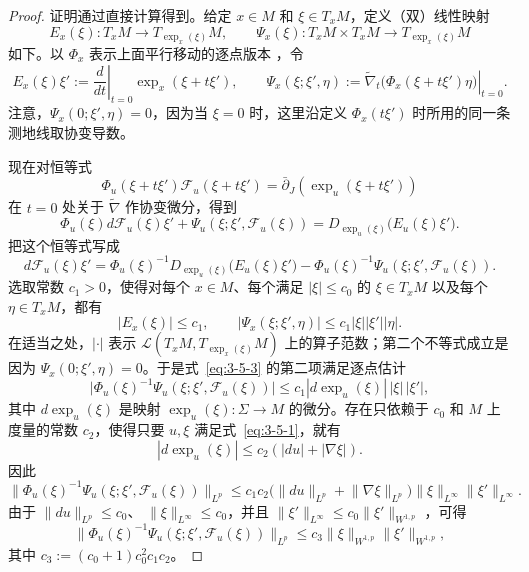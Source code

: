 \begin{proof}
证明通过直接计算得到。给定 $x\in M$ 和 $\xi\in T_xM$，定义（双）线性映射
\[
  E_x(\xi):T_xM\longrightarrow T_{\exp_x(\xi)}M,
  \qquad
  \Psi_x(\xi):T_xM\times T_xM\longrightarrow T_{\exp_x(\xi)}M
\]
如下。以 $\Phi_x$ 表示上面平行移动的逐点版本
，令
\[
  E_x(\xi)\xi'
  :=\left.\frac d{dt}\right|_{t=0}\exp_x(\xi+t\xi'),
  \qquad
  \Psi_x(\xi;\xi',\eta)
  :=\left.\widetilde\nabla_t
  \bigl(\Phi_x(\xi+t\xi')\eta\bigr)\right|_{t=0}.
\]
注意，$\Psi_x(0;\xi',\eta)=0$，因为当 $\xi=0$ 时，这里沿定义
$\Phi_x(t\xi')$ 时所用的同一条测地线取协变导数。

现在对恒等式
\[
  \Phi_u(\xi+t\xi')\mathcal F_u(\xi+t\xi')
  =\bar\partial_J(\exp_u(\xi+t\xi'))
\]
在 $t=0$ 处关于 $\widetilde\nabla$ 作协变微分，得到
\[
  \Phi_u(\xi)d\mathcal F_u(\xi)\xi'
  +\Psi_u(\xi;\xi',\mathcal F_u(\xi))
  =D_{\exp_u(\xi)}\bigl(E_u(\xi)\xi'\bigr).
\]
把这个恒等式写成
\begin{equation}\label{eq:3-5-3}
  d\mathcal F_u(\xi)\xi'
  =\Phi_u(\xi)^{-1}D_{\exp_u(\xi)}\bigl(E_u(\xi)\xi'\bigr)
  -\Phi_u(\xi)^{-1}\Psi_u(\xi;\xi',\mathcal F_u(\xi)).
\end{equation}
选取常数 $c_1>0$，使得对每个 $x\in M$、每个满足 $|\xi|\le c_0$ 的
$\xi\in T_xM$ 以及每个 $\eta\in T_xM$，都有
\[
  |E_x(\xi)|\le c_1,\qquad
  |\Psi_x(\xi;\xi',\eta)|\le c_1|\xi||\xi'||\eta|.
\]
在适当之处，$|\cdot|$ 表示
$\mathcal L(T_xM,T_{\exp_x(\xi)}M)$ 上的算子范数；第二个不等式成立是因为
$\Psi_x(0;\xi',\eta)=0$。于是式~\eqref{eq:3-5-3} 的第二项满足逐点估计
\[
  \bigl|\Phi_u(\xi)^{-1}
  \Psi_u(\xi;\xi',\mathcal F_u(\xi))\bigr|
  \le c_1|d\exp_u(\xi)|\,|\xi|\,|\xi'|,
\]
其中 $d\exp_u(\xi)$ 是映射
$\exp_u(\xi):\Sigma\to M$
的微分。存在只依赖于 $c_0$ 和 $M$ 上度量的常数 $c_2$，使得只要
$u,\xi$ 满足式~\eqref{eq:3-5-1}，就有
\[
  |d\exp_u(\xi)|\le c_2(|du|+|\nabla\xi|).
\]
因此
\[
  \bigl\lVert\Phi_u(\xi)^{-1}
  \Psi_u(\xi;\xi',\mathcal F_u(\xi))\bigr\rVert_{L^p}
  \le c_1c_2
  \bigl(\lVert du\rVert_{L^p}+\lVert\nabla\xi\rVert_{L^p}\bigr)
  \lVert\xi\rVert_{L^\infty}\lVert\xi'\rVert_{L^\infty}.
\]
由于
$\lVert du\rVert_{L^p}\le c_0$、
$\lVert\xi\rVert_{L^\infty}\le c_0$，并且
$\lVert\xi'\rVert_{L^\infty}\le
c_0\lVert\xi'\rVert_{W^{1,p}}$
，可得
\begin{equation}\label{eq:3-5-4}
  \bigl\lVert\Phi_u(\xi)^{-1}
  \Psi_u(\xi;\xi',\mathcal F_u(\xi))\bigr\rVert_{L^p}
  \le c_3\lVert\xi\rVert_{W^{1,p}}
  \lVert\xi'\rVert_{W^{1,p}},
\end{equation}
其中 $c_3:=(c_0+1)c_0^2c_1c_2$。


\end{proof}
